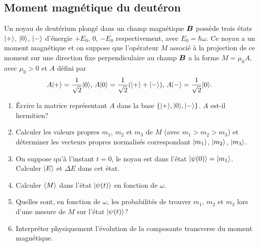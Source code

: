 \subsection{Moment magnétique du deutéron}

Un noyau de deutérium plongé dans un champ magnétique $\boldsymbol{B}$ possède
trois états $\vert+\rangle$, $\vert0\rangle $, $\vert-\rangle$ d'énergie $+E_0$, $0$, $-E_0$
respectivement, avec $E_0=\hbar\omega$. Ce noyau a un moment magnétique et on
suppose que l'opérateur $M$ associé à la projection de ce moment sur une
direction fixe perpendiculaire au champ $\boldsymbol{B}$ a la forme
$M=\mu_0A,$ avec $\mu_0>0$ et $A$ défini par%
\begin{equation}
A\vert+\rangle=\frac{1}{\sqrt{2}}\vert0\rangle,\,A\vert0\rangle=\frac{1}{\sqrt{2}}(\vert+\rangle+\vert-\rangle
),\,A\vert-\rangle =\frac{1}{\sqrt{2}}\vert0\rangle .
\end{equation}

\begin{enumerate}
\item Écrire la matrice représentant $A$ dans la base $\{\vert+\rangle,\vert0\rangle,\vert-\rangle
\}$. $A$ est-il hermitien?

\item Calculer les valeurs propres $m_1$, $m_2$ et $m_3$ de $M$ (avec
$m_1>m_2>m_3$) et déterminer les vecteurs propres normalisés correspondant 
$\vert m_1\rangle$, $\vert m_2\rangle$, $\vert m_3\rangle$.

\item On suppose qu'à l'instant $t=0$, le noyau est dans l'état
$\vert\psi(0)\rangle=\vert m_1\rangle$. Calculer $\vert E\rangle$ et $\Delta E$ dans cet état.

\item Calculer $\langle{M}\rangle$ dans l'état $\vert\psi(t)\rangle$ en fonction de $\omega$.

\item Quelles sont, en fonction de $\omega$, les probabilités de trouver
$m_1$, $m_2$ et $m_3$ lors d'une mesure de $M$ sur l'état $\vert\psi(t)\rangle$?

\item Interpréter physiquement l'évolution de la composante transverse du
moment magnétique.
\end{enumerate}

